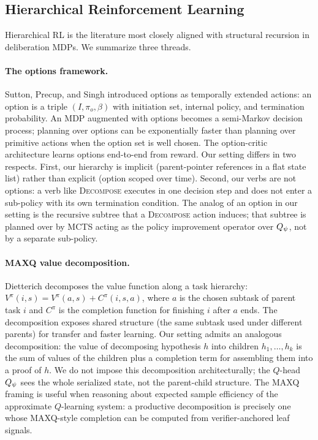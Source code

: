 \subsection{Hierarchical Reinforcement Learning}
\label{sec:background-hrl}

Hierarchical RL is the literature most closely aligned with structural
recursion in deliberation MDPs. We summarize three threads.

\paragraph{The options framework.}
Sutton, Precup, and Singh \citep{sutton1999between} introduced options
as temporally extended actions: an option is a triple
$(I, \pi_o, \beta)$ with initiation set, internal policy, and
termination probability. An MDP augmented with options becomes a
semi-Markov decision process; planning over options can be exponentially
faster than planning over primitive actions when the option set is well
chosen. The option-critic architecture \citep{bacon2017option} learns
options end-to-end from reward. Our setting differs in two respects.
First, our hierarchy is implicit (parent-pointer references in a flat
state list) rather than explicit (option scoped over time). Second, our
verbs are not options: a verb like \textsc{Decompose} executes in one
decision step and does not enter a sub-policy with its own termination
condition. The analog of an option in our setting is the recursive
subtree that a \textsc{Decompose} action induces; that subtree is
planned over by MCTS acting as the policy improvement operator over
$Q_{\psi}$, not by a separate sub-policy.

\paragraph{MAXQ value decomposition.}
Dietterich \citep{dietterich2000hierarchical} decomposes the value
function along a task hierarchy: $V^{\pi}(i, s) = V^{\pi}(a, s) +
C^{\pi}(i, s, a)$, where $a$ is the chosen subtask of parent task $i$
and $C^{\pi}$ is the completion function for finishing $i$ after $a$
ends. The decomposition exposes shared structure (the same subtask used
under different parents) for transfer and faster learning. Our setting
admits an analogous decomposition: the value of decomposing hypothesis
$h$ into children $h_1, \ldots, h_k$ is the sum of values of the
children plus a completion term for assembling them into a proof of $h$.
We do not impose this decomposition architecturally; the $Q$-head
$Q_{\psi}$ sees the whole serialized state, not the parent-child
structure. The MAXQ framing is useful when reasoning about expected
sample efficiency of the approximate $Q$-learning system: a productive
decomposition is precisely one whose MAXQ-style completion can be
computed from verifier-anchored leaf signals.

